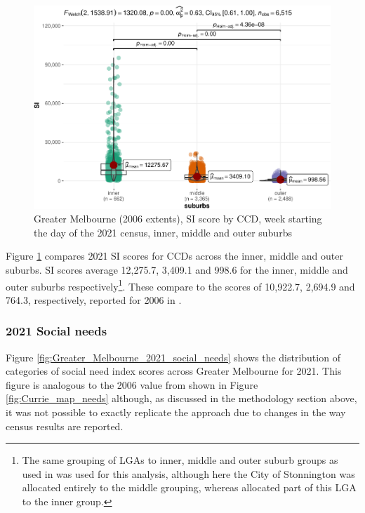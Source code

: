 \documentclass[preprint, 3p,
authoryear]{elsarticle} %
\begin{document}
\begin{figure}
\includegraphics[width=1\linewidth]{Leveraging_GTFS_to_assess_transit_supply_Transport_Geography_files/figure-latex/Greater_Melbourne_CCD_2021_by_suburbs_SI_scores-1} \caption{Greater Melbourne (2006 extents), SI score by CCD, week starting the day of the 2021 census, inner, middle and outer suburbs}\label{fig:Greater_Melbourne_CCD_2021_by_suburbs_SI_scores}
\end{figure}

Figure \ref{fig:Greater_Melbourne_CCD_2021_by_suburbs_SI_scores}
compares 2021 SI scores for CCDs across the inner, middle and outer
suburbs. SI scores average 12,275.7, 3,409.1 and 998.6 for the inner,
middle and outer suburbs respectively\footnote{The same grouping of LGAs
  to inner, middle and outer suburb groups as used in
  \citet{currie2010identifying} was used for this analysis, although
  here the City of Stonnington was allocated entirely to the middle
  grouping, whereas \citet{currie2010identifying} allocated part of this
  LGA to the inner group.}. These compare to the scores of 10,922.7,
2,694.9 and 764.3, respectively, reported for 2006 in
\citet{currie2010identifying}.

\subsubsection{2021 Social needs}\label{social-needs}

Figure \ref{fig:Greater_Melbourne_2021_social_needs} shows the
distribution of categories of social need index scores across Greater
Melbourne for 2021. This figure is analogous to the 2006 value from
\citet{currie2010identifying} shown in Figure \ref{fig:Currie_map_needs}
although, as discussed in the methodology section above, it was not
possible to exactly replicate the \citet{currie2010identifying} approach
due to changes in the way census results are reported.
\end{document}
